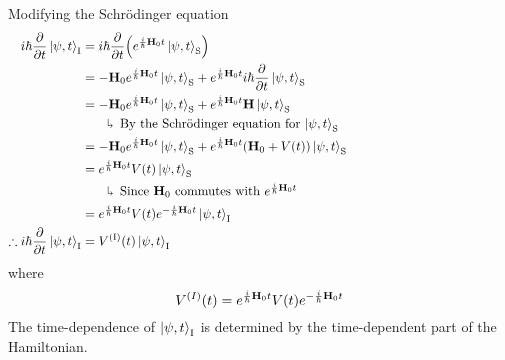 \documentclass[12pt,a4paper,titlepage]{article}
\newcommand{\trm}[1]{\textrm{#1}} %
\newcommand{\explain}[1]{%
	\quad\rotatebox[origin=c]{180}{\enskip$\Lsh$}\hfill
	\begin{minipage}[t]{\dimexpr\linewidth-8em\relax}
	#1
	\end{minipage}\hspace{4em}\bigskip
}
\begin{document}
Modifying the Schr\"{o}dinger equation
\begin{equation}
\begin{aligned}
i\hbar\pdv{t}\ket{\psi,t}_{\trm{I}}&=i\hbar\pdv{t}\qty(e^{\frac{i}{\hbar}\vb{H}_{0}t}\ket{\psi,t}_{\trm{S}})\\
&=-\vb{H}_{0}e^{\frac{i}{\hbar}\vb{H}_{0}t}\ket{\psi,t}_{\trm{S}}+e^{\frac{i}{\hbar}\vb{H}_{0}t}i\hbar\pdv{t}\ket{\psi,t}_{\trm{S}}\\
&=-\vb{H}_{0}e^{\frac{i}{\hbar}\vb{H}_{0}t}\ket{\psi,t}_{\trm{S}}+e^{\frac{i}{\hbar}\vb{H}_{0}t}\vb{H}\ket{\psi,t}_{\trm{S}}\\
&\quad\explain{By the Schr\"{o}dinger equation for $\ket{\psi,t}_{\trm{S}}$}\\
&=-\vb{H}_{0}e^{\frac{i}{\hbar}\vb{H}_{0}t}\ket{\psi,t}_{\trm{S}}+e^{\frac{i}{\hbar}\vb{H}_{0}t}\qty(\vb{H}_{0}+V(t))\ket{\psi,t}_{\trm{S}}\\
&=e^{\frac{i}{\hbar}\vb{H}_{0}t}V(t)\ket{\psi,t}_{\trm{S}}\\
&\quad\explain{Since $\vb{H}_{0}$ commutes with $e^{\frac{i}{\hbar}\vb{H}_{0}t}$}\\
&=e^{\frac{i}{\hbar}\vb{H}_{0}t}V(t)e^{-\frac{i}{\hbar}\vb{H}_{0}t}\ket{\psi,t}_{\trm{I}}\\
\therefore i\hbar\pdv{t}\ket{\psi,t}_{\trm{I}}&=V^{\trm{(I)}}(t)\ket{\psi,t}_{\trm{I}}
\end{aligned}
\end{equation}
where
\begin{equation}
V^{(I)}(t)=e^{\frac{i}{\hbar}\vb{H}_{0}t}V(t)e^{-\frac{i}{\hbar}\vb{H}_{0}t}
\end{equation}
The time-dependence of $\ket{\psi,t}_{\trm{I}}$ is determined by the time-dependent part of the Hamiltonian.\\
\end{document}

